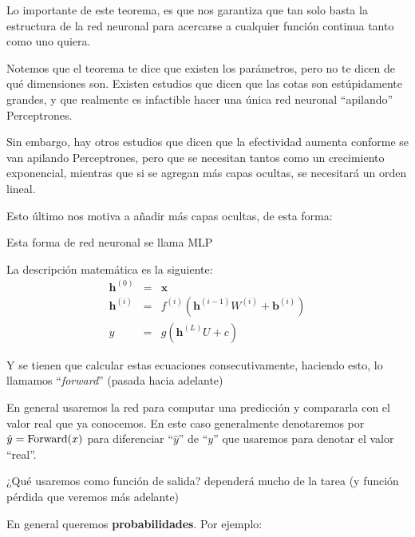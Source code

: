 Lo importante de este teorema, es que nos garantiza que tan solo basta la estructura de la red neuronal para acercarse a cualquier función continua tanto como uno quiera.

Notemos que el teorema te dice que existen los parámetros, pero no te dicen de qué dimensiones son. Existen estudios que dicen que las cotas son estúpidamente grandes, y que realmente es infactible hacer una única red neuronal ``apilando'' Perceptrones. 

Sin embargo, hay otros estudios que dicen que la efectividad aumenta conforme se van apilando Perceptrones, pero que se necesitan tantos como un crecimiento exponencial, mientras que si se agregan más capas ocultas, se necesitará un orden lineal.

Esto último nos motiva a añadir más capas ocultas, de esta forma:

Esta forma de red neuronal se llama MLP

La descripción matemática es la siguiente:
\begin{eqnarray}
\bm{h}^{(0)} &=& \bm{x}\\
\bm{h}^{(i)} &=& f^{(i)}(\bm{h}^{(i-1)} W^{(i)} + \bm{b}^{(i)})\\
y &=& g(\bm{h}^{(L)}U + c)
\end{eqnarray}

Y se tienen que calcular estas ecuaciones consecutivamente, haciendo esto, lo llamamos ``\textit{forward}'' (pasada hacia adelante)

\begin{note}
En general usaremos la red para computar una predicción y compararla con el valor real que ya conocemos. En este caso generalmente denotaremos por $\hat{y}=\operatorname{Forward}(x)$ para diferenciar ``$\hat{y}$'' de ``$y$'' que usaremos para denotar el valor ``real''.
\end{note}

¿Qué usaremos como función de salida? dependerá mucho de la tarea (y función pérdida que veremos más adelante)

En general queremos \textbf{probabilidades}. Por ejemplo:

